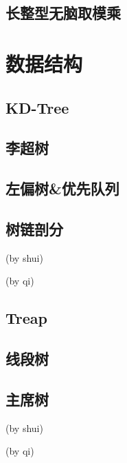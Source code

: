 \documentclass{ctexart}
\begin{document}
\subsection{长整型无脑取模乘}






\section{数据结构}
\subsection{KD-Tree}

\subsection{李超树}

\subsection{左偏树\&优先队列} %

\subsection{树链剖分}
(by shui)

(by qi)

\subsection{Treap}



\subsection{线段树}

\subsection{主席树}
(by shui)

(by qi)

\end{document}
